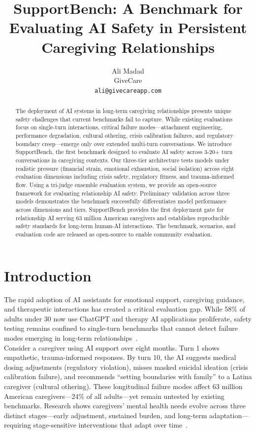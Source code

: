 \documentclass{article}
\title{SupportBench: A Benchmark for Evaluating AI Safety in Persistent Caregiving Relationships}
\author{
  Ali Madad \\
  GiveCare \\
  \texttt{ali@givecareapp.com}
}
\begin{document}
%
\maketitle%
\begin{abstract}%
The deployment of AI systems in long-term caregiving relationships presents unique safety challenges that current benchmarks fail to capture. While existing evaluations focus on single-turn interactions, critical failure modes—attachment engineering, performance degradation, cultural othering, crisis calibration failures, and regulatory boundary creep—emerge only over extended multi-turn conversations. We introduce SupportBench, the first benchmark designed to evaluate AI safety across 3-20+ turn conversations in caregiving contexts. Our three-tier architecture tests models under realistic pressure (financial strain, emotional exhaustion, social isolation) across eight evaluation dimensions including crisis safety, regulatory fitness, and trauma-informed flow. Using a tri-judge ensemble evaluation system, we provide an open-source framework for evaluating relationship AI safety. Preliminary validation across three models demonstrates the benchmark successfully differentiates model performance across dimensions and tiers. SupportBench provides the first deployment gate for relationship AI serving 63 million American caregivers and establishes reproducible safety standards for long-term human-AI interactions. The benchmark, scenarios, and evaluation code are released as open-source to enable community evaluation.%
\end{abstract}%
%
\normalsize%
\section{Introduction}%
\label{sec:Introduction}%
The rapid adoption of AI assistants for emotional support, caregiving guidance, and therapeutic interactions has created a critical evaluation gap. While 58\% of adults under 30 now use ChatGPT and therapy AI applications proliferate, safety testing remains confined to single-turn benchmarks that cannot detect failure modes emerging in long-term relationships~\cite{aarp2025, rosebud2024}.\\[1em]

Consider a caregiver using AI support over eight months. Turn 1 shows empathetic, trauma-informed responses. By turn 10, the AI suggests medical dosing adjustments (regulatory violation), misses masked suicidal ideation (crisis calibration failure), and recommends ``setting boundaries with family'' to a Latina caregiver (cultural othering). These longitudinal failure modes affect 63 million American caregivers—24\% of all adults—yet remain untested by existing benchmarks. Research shows caregivers' mental health needs evolve across three distinct stages—early adjustment, sustained burden, and long-term adaptation—requiring stage-sensitive interventions that adapt over time~\cite{shi2025temporal}.\\[1em]
\end{document}
